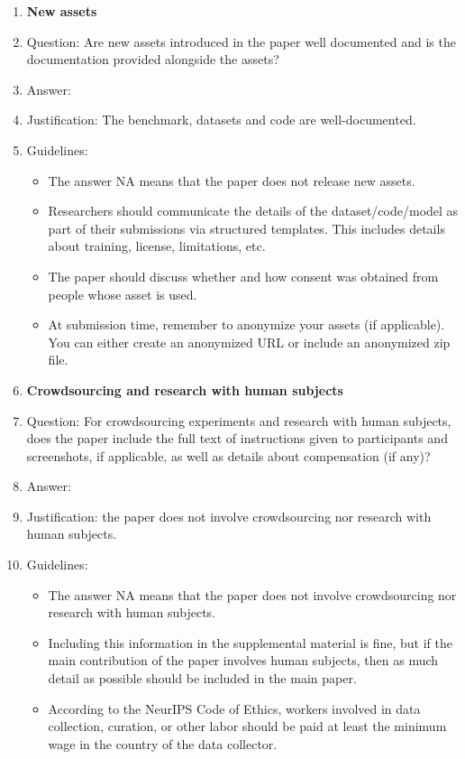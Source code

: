 \begin{enumerate}
\item {\bf New assets}
    \item[] Question: Are new assets introduced in the paper well documented and is the documentation provided alongside the assets?
    \item[] Answer: \answerYes{}%
    \item[] Justification: The benchmark, datasets and code are well-documented.
    \item[] Guidelines:
    \begin{itemize}
        \item The answer NA means that the paper does not release new assets.
        \item Researchers should communicate the details of the dataset/code/model as part of their submissions via structured templates. This includes details about training, license, limitations, etc. 
        \item The paper should discuss whether and how consent was obtained from people whose asset is used.
        \item At submission time, remember to anonymize your assets (if applicable). You can either create an anonymized URL or include an anonymized zip file.
    \end{itemize}

\item {\bf Crowdsourcing and research with human subjects}
    \item[] Question: For crowdsourcing experiments and research with human subjects, does the paper include the full text of instructions given to participants and screenshots, if applicable, as well as details about compensation (if any)? 
    \item[] Answer: \answerNA{} %
    \item[] Justification: the paper does not involve crowdsourcing nor research with human subjects.
    \item[] Guidelines:
    \begin{itemize}
        \item The answer NA means that the paper does not involve crowdsourcing nor research with human subjects.
        \item Including this information in the supplemental material is fine, but if the main contribution of the paper involves human subjects, then as much detail as possible should be included in the main paper. 
        \item According to the NeurIPS Code of Ethics, workers involved in data collection, curation, or other labor should be paid at least the minimum wage in the country of the data collector. 
    \end{itemize}


\end{enumerate}
